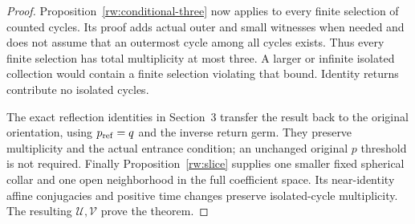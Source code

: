 \begin{proof}
Proposition~\ref{rw:conditional-three} now applies to every finite
selection of counted cycles. Its proof adds actual outer and small
witnesses when needed and does not assume that an outermost cycle
among all cycles exists. Thus every finite selection has total
multiplicity at most three. A larger or infinite isolated collection
would contain a finite selection violating that bound.
Identity returns contribute no isolated cycles.

The exact reflection identities in Section~3 transfer the result
back to the original orientation, using $p_{\rm ref}=q$ and the
inverse return germ. They preserve multiplicity and the actual
entrance condition; an unchanged original $p$ threshold is not
required. Finally Proposition~\ref{rw:slice} supplies one smaller
fixed spherical collar and one open neighborhood in the full
coefficient space. Its near-identity affine conjugacies and positive
time changes preserve isolated-cycle multiplicity. The resulting
$\mathscr U,\mathscr V$ prove the theorem.
\end{proof}
